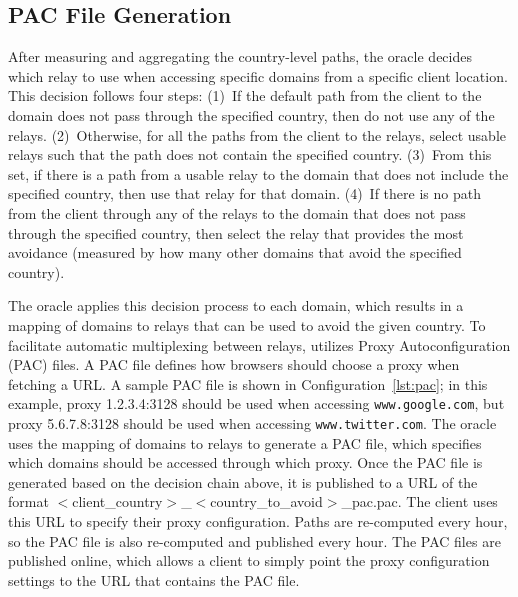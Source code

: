 \subsection{PAC File Generation}
\label{multiplex}
After measuring and aggregating the country-level paths, the oracle decides 
which relay to use when accessing specific domains from a specific client 
location.  This decision follows four steps:
(1)~If the default path from the client to the domain does not pass through 
the specified country, then do not use any of the relays. 
(2)~Otherwise, for all the paths from the client to the relays, select usable relays 
such that the path does not contain the specified country.
(3)~From this set, if there is a path from a 
usable relay to the domain that does not include the specified country, then 
use that relay for that domain.
(4)~If there is no path from the client through any of the relays to the domain 
that does not pass through the specified country, then select the relay 
that provides the most avoidance (measured by how many other domains
that avoid the specified country). 

The oracle applies this decision process to each domain, which results in a mapping 
of domains to relays that can be used to avoid the given country.  To facilitate 
automatic multiplexing between relays, \system{} utilizes Proxy Autoconfiguration (PAC) 
files.  A PAC file defines how browsers should choose a proxy when fetching a URL.  A 
sample PAC file is shown in Configuration~\ref{lst:pac}; in this example, proxy 
1.2.3.4:3128 should be used when accessing {\tt www.google.com}, but proxy 
5.6.7.8:3128 should be used when accessing {\tt www.twitter.com}.  The oracle uses 
the mapping of domains to relays to generate a PAC 
file, which specifies which domains should be accessed through which proxy.  Once the PAC 
file is generated based on the decision chain above, it is published to a URL 
of the format $<$client\_country$>$\_$<$country\_to\_avoid$>$\_pac.pac.  The client 
uses this URL to specify their proxy configuration.  Paths are re-computed 
every hour, so the PAC file is also re-computed and published every hour.  The PAC files 
are published online, which allows a client to simply point the proxy
configuration settings to the URL that contains the PAC file. 

\renewcommand{\lstlistingname}{Configuration}


